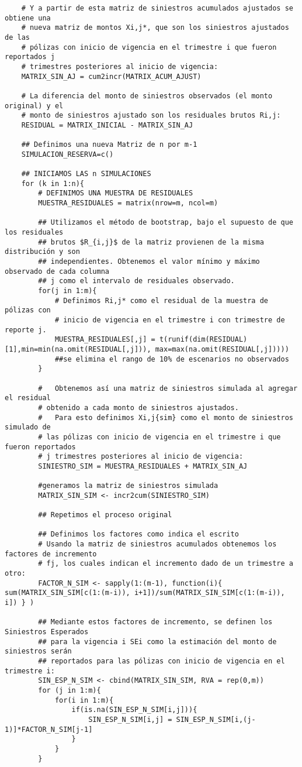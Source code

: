 \documentclass[11pt,twoside,openright,spanish]{report}
\numberwithin{equation}{chapter}
\numberwithin{figure}{chapter}
\numberwithin{table}{chapter}
\begin{document}
\begin{lstlisting}
	# Y a partir de esta matriz de siniestros acumulados ajustados se obtiene una
	# nueva matriz de montos Xi,j*, que son los siniestros ajustados de las
	# pólizas con inicio de vigencia en el trimestre i que fueron reportados j 
	# trimestres posteriores al inicio de vigencia:
	MATRIX_SIN_AJ = cum2incr(MATRIX_ACUM_AJUST)
	
	# La diferencia del monto de siniestros observados (el monto original) y el 
	# monto de siniestros ajustado son los residuales brutos Ri,j:
	RESIDUAL = MATRIX_INICIAL - MATRIX_SIN_AJ
	
	## Definimos una nueva Matriz de n por m-1
	SIMULACION_RESERVA=c()
	
	## INICIAMOS LAS n SIMULACIONES
	for (k in 1:n){
		# DEFINIMOS UNA MUESTRA DE RESIDUALES
		MUESTRA_RESIDUALES = matrix(nrow=m, ncol=m)
		
		## Utilizamos el método de bootstrap, bajo el supuesto de que los residuales
		## brutos $R_{i,j}$ de la matriz provienen de la misma distribución y son 
		## independientes. Obtenemos el valor mínimo y máximo observado de cada columna
		## j como el intervalo de residuales observado.
		for(j in 1:m){
			# Definimos Ri,j* como el residual de la muestra de pólizas con 
			# inicio de vigencia en el trimestre i con trimestre de reporte j. 
			MUESTRA_RESIDUALES[,j] = t(runif(dim(RESIDUAL)[1],min=min(na.omit(RESIDUAL[,j])), max=max(na.omit(RESIDUAL[,j]))))
			##se elimina el rango de 10% de escenarios no observados
		}
		
		#	Obtenemos así una matriz de siniestros simulada al agregar el residual 
		# obtenido a cada monto de siniestros ajustados.
		#	Para esto definimos Xi,j{sim} como el monto de siniestros simulado de
		# las pólizas con inicio de vigencia en el trimestre i que fueron reportados 
		# j trimestres posteriores al inicio de vigencia:
		SINIESTRO_SIM = MUESTRA_RESIDUALES + MATRIX_SIN_AJ
		
		#generamos la matriz de siniestros simulada
		MATRIX_SIN_SIM <- incr2cum(SINIESTRO_SIM)
		
		## Repetimos el proceso original
		
		## Definimos los factores como indica el escrito
		# Usando la matriz de siniestros acumulados obtenemos los factores de incremento
		# fj, los cuales indican el incremento dado de un trimestre a otro:
		FACTOR_N_SIM <- sapply(1:(m-1), function(i){ sum(MATRIX_SIN_SIM[c(1:(m-i)), i+1])/sum(MATRIX_SIN_SIM[c(1:(m-i)), i]) } )
		
		## Mediante estos factores de incremento, se definen los Siniestros Esperados
		## para la vigencia i SEi como la estimación del monto de siniestros serán 
		## reportados para las pólizas con inicio de vigencia en el trimestre i:
		SIN_ESP_N_SIM <- cbind(MATRIX_SIN_SIM, RVA = rep(0,m))
		for (j in 1:m){
			for(i in 1:m){
				if(is.na(SIN_ESP_N_SIM[i,j])){
					SIN_ESP_N_SIM[i,j] = SIN_ESP_N_SIM[i,(j-1)]*FACTOR_N_SIM[j-1]
				}
			}
		}
		

\end{lstlisting}
\end{document}
